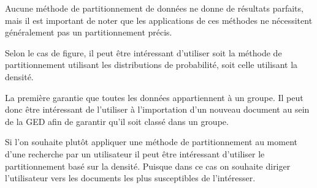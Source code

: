 Aucune méthode de partitionnement de données ne donne de résultats parfaits, mais il est important de noter que les applications de ces méthodes ne nécessitent généralement pas un partitionnement précis.

Selon le cas de figure, il peut être intéressant d'utiliser soit la méthode de partitionnement utilisant les distributions de probabilité, soit celle utilisant la densité.

La première garantie que toutes les données appartiennent à un groupe.
Il peut donc être intéressant de l'utiliser à l'importation d'un nouveau document au sein de la GED afin de garantir qu'il soit classé dans un groupe.

Si l'on souhaite plutôt appliquer une méthode de partitionnement au moment d'une recherche par un utilisateur il peut être intéressant d'utiliser le partitionnement basé sur la densité.
Puisque dans ce cas on souhaite diriger l'utilisateur vers les documents les plus susceptibles de l'intéresser.